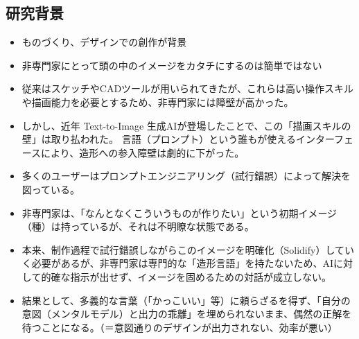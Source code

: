 \documentclass[dvipdfmx]{jlreq}
\begin{document}
\subsection{研究背景}
\begin{itemize}
  \item ものづくり、デザインでの創作が背景
  \item 非専門家にとって頭の中のイメージをカタチにするのは簡単ではない
  \item 従来はスケッチやCADツールが用いられてきたが、これらは高い操作スキルや描画能力を必要とするため、非専門家には障壁が高かった。
  \item しかし、近年 Text-to-Image 生成AIが登場したことで、この「描画スキルの壁」は取り払われた。 言語（プロンプト）という誰もが使えるインターフェースにより、造形への参入障壁は劇的に下がった。
  \item 多くのユーザーはプロンプトエンジニアリング（試行錯誤）によって解決を図っている。
  \item 非専門家は、「なんとなくこういうものが作りたい」という初期イメージ（種）は持っているが、それは不明瞭な状態である。
  \item 本来、制作過程で試行錯誤しながらこのイメージを明確化（Solidify）していく必要があるが、非専門家は専門的な「造形言語」を持たないため、AIに対して的確な指示が出せず、イメージを固めるための対話が成立しない。
  \item 結果として、多義的な言葉（「かっこいい」等）に頼らざるを得ず、「自分の意図（メンタルモデル）と出力の乖離」を埋められないまま、偶然の正解を待つことになる。（＝意図通りのデザインが出力されない、効率が悪い）

\end{itemize}
\end{document}
